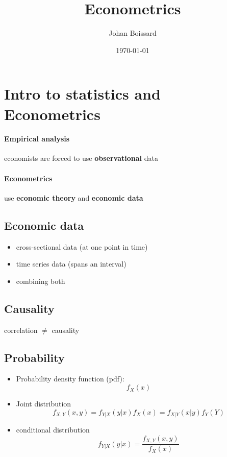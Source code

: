 \documentclass[a4paper,titlepage] {scrartcl}
\author{Johan Boissard}
\date{\today}
\title{Econometrics}
\begin{document}

\section{Intro to statistics and Econometrics}

\paragraph{Empirical analysis} %
\label{par:empirical_analysis}
economists are forced to use \textbf{observational} data

\paragraph{Econometrics} %
\label{par:econometrics}
use \textbf{economic theory} and \textbf{economic data}

\subsection{Economic data}
\begin{itemize}
	\item cross-sectional data (at one point in time)
	\item time series data (spans an interval)
	\item combining both
\end{itemize}

\subsection{Causality}
correlation $\neq$ causality

\subsection{Probability}
\begin{itemize}
	\item Probability density function (pdf): 
	\begin{equation}
		f_X(x)
	\end{equation}
	\item Joint distribution
	\begin{equation}
		f_{X,Y}(x,y)=f_{Y|X}(y|x)f_X(x)=f_{X|Y}(x|y)f_Y(Y) 
	\end{equation}
	\item conditional distribution
	\begin{equation}
		f_{Y|X}(y|x)=\frac{f_{X,Y}(x,y)}{f_X(x)}
	\end{equation}
\end{itemize}
\end{document}
